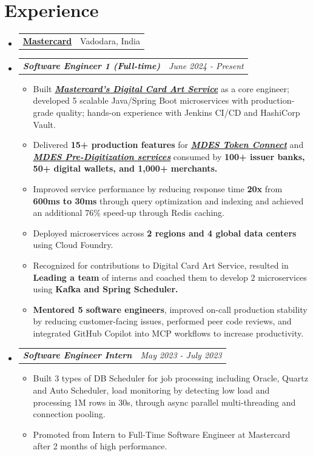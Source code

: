\documentclass[a4paper,10pt]{article}
\makeatletter
\newcommand{\companyName}[2]{
  \vspace{-1pt}\item
    \begin{tabular*}{0.97\textwidth}{l@{\extracolsep{\fill}}r}
    \fontsize{12}{16}\selectfont\textbf{#1} & #2 \\
    \end{tabular*}\vspace{-5pt}
}
\newcommand{\resumeSubheadingContinuation}[2]{
  \item[{$\circ$}]
    \begin{tabular*}{0.97\textwidth}{l@{\extracolsep{\fill}}r}
      \textbf{\textit{#1}} & \textit{#2} \\
    \end{tabular*}\vspace{-5pt}
}
\newcommand{\resumeSubHeadingListStart}{\begin{itemize}[leftmargin=*]}
\newcommand{\resumeSubHeadingListEnd}{\end{itemize}}
\makeatother
\begin{document}
\section{Experience}
  \resumeSubHeadingListStart
    \companyName{\href{https://www.mastercard.co.in/en-in.html}{Mastercard}}{Vadodara, India}
    \resumeSubheadingContinuation{Software Engineer 1 (Full-time)}{June 2024 - Present}
    \begin{itemize}[leftmargin=*]

        \item Built \textbf{\textit{\href{https://developer.mastercard.com/mdes-digital-card-art-service/documentation/}{Mastercard’s Digital Card Art Service}}} as a core engineer; developed 5 scalable Java/Spring Boot microservices with production-grade quality; hands-on experience with Jenkins CI/CD and HashiCorp Vault.

        \item Delivered \textbf{15+ production features} for \textbf{\textit{\href{https://developer.mastercard.com/mdes-token-connect/documentation/}{MDES Token Connect}}} and \textbf{\textit{\href{https://developer.mastercard.com/mdes-pre-digitization/documentation/}{MDES Pre-Digitization services}}} consumed by \textbf{100+ issuer banks, 50+ digital wallets, and 1,000+ merchants.}

        \item Improved service performance by reducing response time \textbf{20x} from \textbf{600ms to 30ms} through query optimization and indexing and achieved an additional 76\% speed-up through Redis caching.

        \item Deployed microservices across \textbf{2 regions and 4 global data centers} using Cloud Foundry.

        \item Recognized for contributions to Digital Card Art Service, resulted in \textbf{Leading a team} of interns and coached them to develop 2 microservices using \textbf{Kafka and Spring Scheduler.}

        \item \textbf{Mentored 5 software engineers}, improved on-call production stability by reducing customer-facing issues, performed peer code reviews, and integrated GitHub Copilot into MCP workflows to increase productivity.

    \end{itemize}
    \resumeSubheadingContinuation{Software Engineer Intern}{May 2023 - July 2023}
    \begin{itemize}[leftmargin=*]
        \item Built 3 types of DB Scheduler for job processing including Oracle, Quartz and Auto Scheduler, load monitoring by detecting low load and processing 1M rows in 30s, through async parallel multi-threading and connection pooling.
        \item Promoted from Intern to Full-Time Software Engineer at Mastercard after 2 months of high performance.
    \end{itemize}
\resumeSubHeadingListEnd
\end{document}
